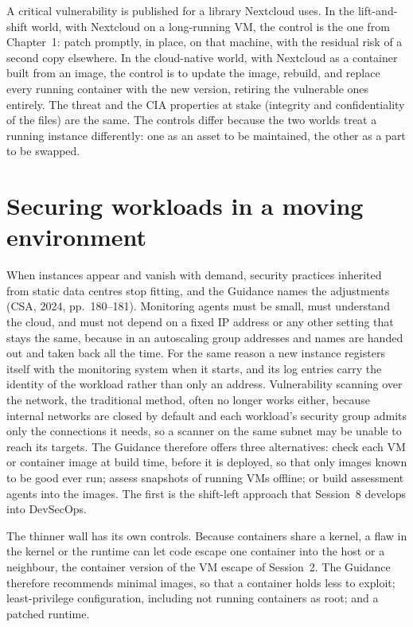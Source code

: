 \begin{example}\label{ex:patch-two-worlds}
A critical vulnerability is published for a library Nextcloud uses. In the
lift-and-shift world, with Nextcloud on a long-running VM, the control is the
one from Chapter~1: patch promptly, in place, on that machine, with the
residual risk of a second copy elsewhere. In the cloud-native world, with
Nextcloud as a container built from an image, the control is to update the
image, rebuild, and replace every running container with the new version,
retiring the vulnerable ones entirely. The threat and the CIA properties at
stake (integrity and confidentiality of the files) are the same. The controls
differ because the two worlds treat a running instance differently: one as an
asset to be maintained, the other as a part to be swapped.
\end{example}

\section{Securing workloads in a moving environment}

When instances appear and vanish with demand, security practices inherited
from static data centres stop fitting, and the Guidance names the
adjustments (CSA, 2024, pp.~180--181). Monitoring agents must be small, must
understand the cloud, and must not depend on a fixed IP address or any other
setting that stays the same, because in an autoscaling group addresses and
names are handed out and taken back all the time. For the same reason a new
instance registers itself with the monitoring system when it starts, and
its log entries carry the identity of the workload rather than only an
address. Vulnerability scanning over the network, the traditional method,
often no longer works either, because internal networks are closed by
default and each workload's security group admits only the connections it
needs, so a scanner on the same subnet may be unable to reach its targets.
The Guidance therefore offers three alternatives: check each VM or container
image at build time, before it is deployed, so that only images known to be
good ever run; assess snapshots of running VMs offline; or build assessment
agents into the images. The first is the shift-left approach that Session~8
develops into DevSecOps.

The thinner wall has its own controls. Because containers share a kernel, a
flaw in the kernel or the runtime can let code escape one container into the
host or a neighbour, the container version of the VM escape of Session~2.
The Guidance therefore recommends minimal images, so that a container holds
less to exploit; least-privilege configuration, including not running
containers as root; and a patched runtime.

